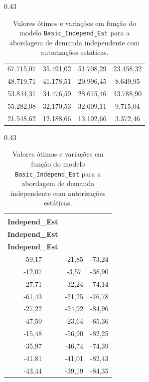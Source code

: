 \begin{table}[H]
\begin{subtable}[t]{0.43\textwidth}
\begin{tabular}{@{}cccc@{}}
			67.715,07  & 35.491,02                       & 51.708,29  & 23.458,32  \\
			48.719,71  & 41.178,51                       & 20.996,45  & 8.649,95   \\
			53.844,31  & 34.476,59                       & 28.675,46  & 13.788,90  \\
			55.282,08  & 32.170,53                       & 32.609,11  & 9.715,04   \\
			21.548,62  & 12.188,66                       & 13.102,66  & 3.372,46   \\
			\bottomrule
		\end{tabular}
		\caption{Z* (\$)}
	\end{subtable}
	\hfill
	\begin{subtable}[t]{0.43\textwidth}
		\centering
		\begin{tabular}{@{}ccc@{}}
			\toprule
			\makecell[c]{\textbf{Fulfill\_}                  \\\textbf{Independ\_Est}}
			       & \makecell[c]{\textbf{Skipla\_}          \\\textbf{Independ\_Est}}
			       & \makecell[c]{\textbf{Comp\_}            \\\textbf{Independ\_Est}} \\
			\midrule
			-59,17 & -21,85                         & -73,24 \\
			-12,07 & -3,57                          & -38,90 \\
			-27,71 & -32,24                         & -74,14 \\
			-61,43 & -21,25                         & -76,78 \\
			-27,22 & -24,92                         & -84,96 \\
			-47,59 & -23,64                         & -65,36 \\
			-15,48 & -56,90                         & -82,25 \\
			-35,97 & -46,74                         & -74,39 \\
			-41,81 & -41,01                         & -82,43 \\
			-43,44 & -39,19                         & -84,35 \\
			\bottomrule
		\end{tabular}
		\caption{Variação das diferenças no Z* (\%)}
	\end{subtable}
	\caption{Valores ótimos e variações em função do modelo \texttt{Basic\_Independ\_Est} para a abordagem de demanda independente com autorizações estáticas.}
	\label{tab: tab_Basic_Independ_Est}
\end{table}


